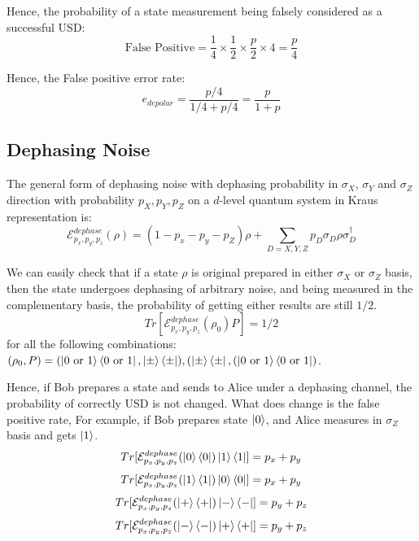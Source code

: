 \documentclass[%
 reprint,
superscriptaddress,
 amsmath,amssymb,
 aps,
]{revtex4-2}
\begin{document}
Hence, the probability of a state measurement being falsely considered as a successful USD:
\begin{equation}
    \text{False Positive}=\frac{1}{4}\times\frac{1}{2}\times\frac{p}{2}\times4 = \frac{p}{4}
\end{equation}

Hence, the False positive error rate:
\begin{equation}
    e_{depolar}=\frac{p/4}{1/4+p/4}=\frac{p}{1+p}
\end{equation}

\subsection{Dephasing Noise}
The general form of dephasing noise with dephasing probability in $\sigma_X$, $\sigma_Y$ and $\sigma_Z$ direction with probability $p_X, p_Y, p_Z$ on a $d$-level quantum system in Kraus representation is:
\begin{equation}
    \mathcal{E}^{dephase}_{p_x, p_y, p_z}(\rho)=(1-p_x-p_y-p_Z)\rho+\sum_{D=X, Y, Z}p_D\sigma_D\rho\sigma_D^\dagger
\end{equation}

We can easily check that if a state $\rho$ is original prepared in either $\sigma_X$ or $\sigma_Z$ basis, then the state undergoes dephasing of arbitrary noise, and being measured in the complementary basis, the probability of getting either results are still $1/2$.
\begin{equation}
    Tr[\mathcal{E}^{dephase}_{p_x, p_y, p_z}(\rho_0)P]=1/2
\end{equation}
for all the following combinations: $(\rho_0, P)=(\ket{0\text{ or }1}\bra{0\text{ or }1}, \ket{\pm}\bra{\pm}), (\ket{\pm}\bra{\pm}, (\ket{0\text{ or }1}\bra{0\text{ or }1})$.

Hence, if Bob prepares a state and sends to Alice under a dephasing channel, the probability of correctly USD is not changed. What does change is the false positive rate, For example, if Bob prepares state $\ket{0}$, and Alice measures in $\sigma_Z$ basis and gets $\ket{1}$.
\begin{equation}
Tr[\mathcal{E}^{dephase}_{p_x, p_y, p_z}(\ket{0}\bra{0})\ket{1}\bra{1}]=p_x+p_y
\end{equation}
\begin{equation}
Tr[\mathcal{E}^{dephase}_{p_x, p_y, p_z}(\ket{1}\bra{1})\ket{0}\bra{0}]=p_x+p_y
\end{equation}
\begin{equation}
Tr[\mathcal{E}^{dephase}_{p_x, p_y, p_z}(\ket{+}\bra{+})\ket{-}\bra{-}]=p_y+p_z
\end{equation}
\begin{equation}
Tr[\mathcal{E}^{dephase}_{p_x, p_y, p_z}(\ket{-}\bra{-})\ket{+}\bra{+}]=p_y+p_z
\end{equation}
\end{document}
